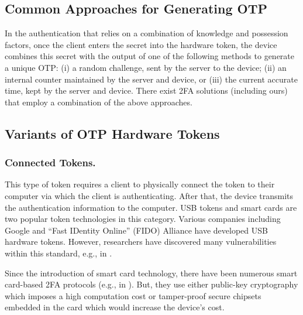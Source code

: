 \vspace{-5mm}
\subsection{Common Approaches for Generating OTP}
\vspace{-2mm}

In the authentication that relies on a combination of knowledge and possession factors, once the client enters the secret into the hardware token, the device combines this secret with the output of one of the following methods to generate a unique OTP:  (i) a random challenge, sent by the server to the device;  (ii) an internal counter maintained by the server and device, or (iii) the current accurate time, kept by the server and device. There exist 2FA solutions (including ours) that employ a combination of the above approaches. 

\vspace{-4mm}
\subsection{Variants of OTP Hardware Tokens}

\vspace{-2mm}
\subsubsection{Connected Tokens.}
This type of token requires a client to physically connect the token to their computer via which the client is authenticating. After that, the device transmits the authentication information to the computer. USB tokens and smart cards are two popular token technologies in this category.  Various companies including Google and  ``Fast IDentity Online'' (FIDO) Alliance have developed USB hardware tokens. However, researchers have discovered many vulnerabilities within this standard, e.g., in \cite{PanosMNPX17,ChangMSS17,LoutfiJ15,ndss/FengLP021}.  

Since the introduction of smart card technology, there have been numerous smart card-based 2FA protocols (e.g., in \cite{gupta2021machine,WangW18,radhakrishnan2022dependable,kim2009more}). But, they use either public-key cryptography which imposes a high computation cost or tamper-proof secure chipsets embedded in the card which would increase the device's cost. 






